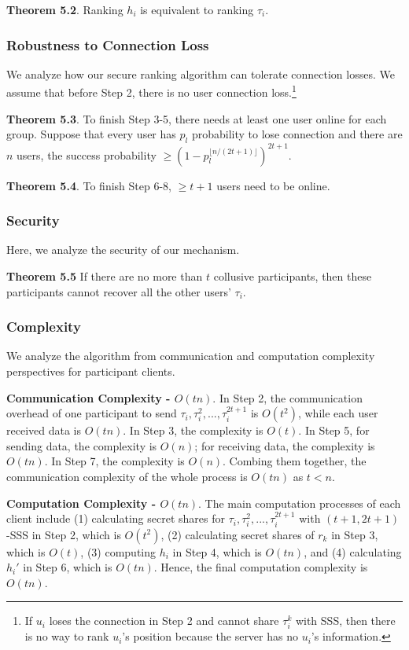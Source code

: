 \vspace{+.5em}
\textbf{Theorem 5.2}. Ranking $h_i$ is equivalent to ranking $\tau_i$.


\subsubsection{Robustness to Connection Loss} We analyze how our secure ranking algorithm can tolerate connection losses. We assume that before Step 2, there is no user connection loss.\footnote{If $u_i$ loses the connection in Step 2 and cannot share $\tau_i^k$ with SSS, then there is no way to rank $u_i$'s position because the server has no $u_i$'s information.}

\vspace{+.5em}
\textbf{Theorem 5.3}. To finish Step 3-5, there needs at least one user online for each group. Suppose that every user has $p_l$ probability to lose connection and there are $n$ users, the success probability $\ge (1-p_l^{\lfloor n/(2t+1) \rfloor})^{2t+1}$.


\vspace{+.5em}
\textbf{Theorem 5.4}. To finish Step 6-8, $\ge t+1$ users need to be online.



\subsubsection{Security} Here, we analyze the security of our mechanism.

\vspace{+.5em}
\textbf{Theorem 5.5} If there are no more than $t$ collusive participants, then these participants cannot recover all the other users' $\tau_i$.






\subsubsection{Complexity} We analyze the algorithm from communication and computation complexity perspectives for participant clients.

\textbf{Communication Complexity - $O(tn)$}. In Step 2, the communication overhead of one participant to send $\tau_i,\tau_i^2,...,\tau_i^{2t+1}$ is $O(t^2)$, while each user received data is $O(tn)$. In Step 3, the complexity is $O(t)$. In Step 5, for sending data, the complexity is $O(n)$; for receiving data, the complexity is $O(tn)$. In Step 7, the complexity is $O(n)$. Combing them together, the communication complexity of the whole process is $O(tn)$ as $t<n$.


\textbf{Computation Complexity - $O(tn)$}. The main computation processes of each client include (1) calculating secret shares for $\tau_i,\tau_i^2,...,\tau_i^{2t+1}$ with $(t+1, 2t+1)$-SSS in Step 2, which is $O(t^2)$, (2) calculating secret shares of $r_k$ in Step 3, which is $O(t)$, (3) computing  $h_i$ in Step 4, which is $O(tn)$, and (4) calculating $h_i'$ in Step 6, which is $O(tn)$. Hence, the final computation complexity is $O(tn)$.
